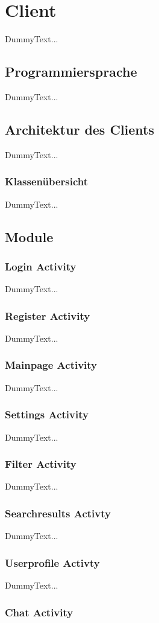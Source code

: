 \documentclass[a4paper,11pt]{report}
\begin{document}
		\section{Client}
		DummyText...
			\subsection{Programmiersprache}
			DummyText...
			\subsection{Architektur des Clients}
			DummyText...
				\subsubsection{Klassenübersicht}
				DummyText...
			
			\subsection{Module}
				\subsubsection{Login Activity}
				DummyText...
				\subsubsection{Register Activity}
				DummyText...
				\subsubsection{Mainpage Activity}
				DummyText...
				\subsubsection{Settings Activity}
				DummyText...
				\subsubsection{Filter Activity}
				DummyText...
				\subsubsection{Searchresults Activty}
				DummyText...
				\subsubsection{Userprofile Activty}
				DummyText...
				\subsubsection{Chat Activity}
		
\newpage
	
	
\end{document}
